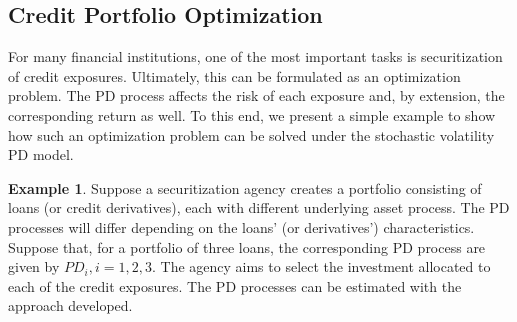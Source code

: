 \documentclass[11pt,reqno]{article}
\theoremstyle{definition}
\newtheorem{example}[theorem]{Example}
\begin{document}
\subsection{Credit Portfolio Optimization}
For many financial institutions, one of the most important tasks is securitization of credit exposures. Ultimately, this can be formulated as an optimization problem. The PD process affects the risk of each exposure and, by extension, the corresponding return as well. To this end, we present a simple example to show how such an optimization problem can be solved under the stochastic volatility PD model. 
\begin{example}
Suppose a securitization agency creates a portfolio consisting of loans (or credit derivatives), each with different underlying asset process. The PD processes will differ depending on the loans' (or derivatives') characteristics. Suppose that, for a portfolio of three loans, the corresponding PD process are given by $PD_i, i=1,2,3$. The agency aims to select the investment allocated to each of the credit exposures. The PD processes can be estimated with the approach developed. 


\end{example}
\end{document}
